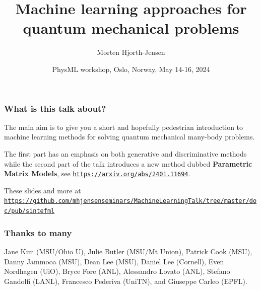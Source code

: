 \documentclass[11pt]{beamer} %
\begin{document}
\title{Machine learning approaches for quantum mechanical problems}


\author{Morten Hjorth-Jensen}

\date{PhysML workshop, Oslo, Norway, May 14-16, 2024
}

\begin{frame}
\titlepage
\end{frame}

\begin{frame}
\frametitle{What is this talk about?}


The main aim is to give you a short and hopefully pedestrian
introduction to machine learning methods for solving quantum
mechanical many-body problems.

The first part has an emphasis on both generative and discriminative
methods while the second part of the talk introduces a new method
dubbed \textbf{Parametric Matrix Models}, see
\href{{https://arxiv.org/abs/2401.11694}}{\nolinkurl{https://arxiv.org/abs/2401.11694}}.

These slides and more at \href{{https://github.com/mhjensenseminars/MachineLearningTalk/tree/master/doc/pub/sintefml}}{\nolinkurl{https://github.com/mhjensenseminars/MachineLearningTalk/tree/master/doc/pub/sintefml}}
\end{frame}

\begin{frame}
\frametitle{Thanks to many}

Jane Kim (MSU/Ohio U), Julie Butler (MSU/Mt Union), Patrick Cook (MSU), Danny Jammooa (MSU), Dean Lee (MSU), Daniel Lee (Cornell), Even Nordhagen (UiO), Bryce Fore (ANL), Alessandro Lovato (ANL), Stefano Gandolfi (LANL), Francesco Pederiva (UniTN), and Giuseppe Carleo (EPFL).
\end{frame}
\end{document}
